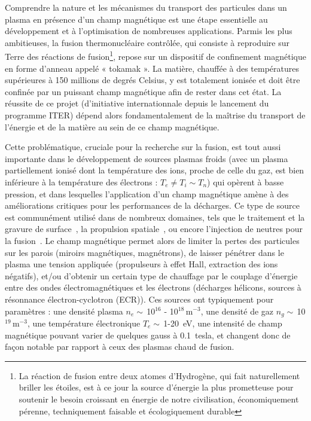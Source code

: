 
\begin{refsection}


Comprendre la nature et les mécanismes du transport des particules dans un
plasma en présence d'un champ magnétique est une étape essentielle au
développement et à l'optimisation de nombreuses applications.
Parmis les plus ambitieuses, la fusion thermonucléaire contrôlée, qui
consiste à reproduire sur Terre des réactions de fusion\footnote{La réaction de fusion entre deux atomes d'Hydrogène, 
qui fait naturellement briller les étoiles, est à ce jour la source d'énergie
la plus prometteuse pour soutenir le besoin croissant en énergie de notre civilisation,
économiquement pérenne, techniquement faisable et écologiquement durable}, repose sur un
dispositif de confinement magnétique en forme d'anneau appelé « tokamak ».
La matière, chauffée à des températures supérieures à 150 millions de degrés
Celsius, y est totalement ionisée et doit être confinée par un puissant champ magnétique afin
de rester dans cet état. La réussite de ce projet (d'initiative
internationnale depuis le lancement du programme ITER) dépend alors
fondamentalement de la maîtrise du transport de l'énergie et de la matière au
sein de ce champ magnétique.

Cette problématique, cruciale pour la recherche sur la fusion, est tout aussi
importante dans le développement de sources plasmas froids (avec un plasma
partiellement ionisé dont la température des ions, proche de celle du gaz,
est bien inférieure à la température des électrons : $T_e\neq T_i\sim
T_n$) qui opèrent à basse pression, et dans lesquelles l'application d'un champ
magnétique amène à des améliorations critiques pour les performances de la
décharges. Ce type de source est communément utilisé dans de
nombreux domaines, tels que le traitement et la gravure de
surface~\parencite{Lieberman}, la propulsion spatiale~\parencite{Zhurin}, ou
encore l'injection de neutres pour la fusion~\parencite{SimoninHDR}. Le champ
magnétique permet alors de limiter la pertes des particules sur les parois (miroirs magnétiques,
magnétrons), de laisser pénétrer dans le plasma une tension appliquée
(propulseurs à effet Hall, extraction des ions négatifs), et/ou d'obtenir un
certain type de chauffage par le couplage d'énergie entre des ondes
électromagnétiques et les électrons (décharges hélicons, sources à résonnance
électron-cyclotron (ECR)). Ces sources ont typiquement pour paramètres : une
densité plasma $n_e\sim\,$10$^{16}$ - 10$^{18}\,$m$^{-3}$, une densité de gaz
$n_g\sim\,$10$^{19}\,$m$^{-3}$, une température électronique $T_e\sim\,$1-20~eV,
une intensité de champ magnétique pouvant varier de quelques gauss à 0.1~tesla,
et changent donc de façon notable par rapport à ceux des plasmas chaud de fusion.


\end{refsection}
